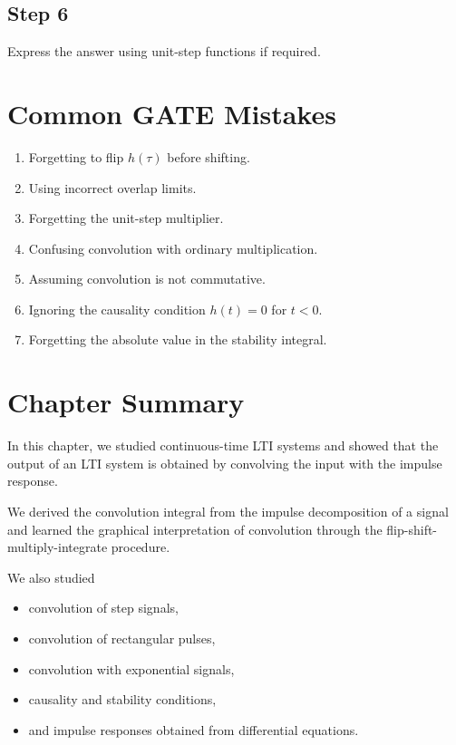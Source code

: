 \subsection{Step 6}

Express the answer using unit-step functions if required.


\section{Common GATE Mistakes}

\begin{enumerate}
\item Forgetting to flip \(h(\tau)\) before shifting.
\item Using incorrect overlap limits.
\item Forgetting the unit-step multiplier.
\item Confusing convolution with ordinary multiplication.
\item Assuming convolution is not commutative.
\item Ignoring the causality condition \(h(t)=0\) for \(t<0\).
\item Forgetting the absolute value in the stability integral.
\end{enumerate}


\section{Chapter Summary}

In this chapter, we studied continuous-time LTI systems and showed that the
output of an LTI system is obtained by convolving the input with the impulse
response.

We derived the convolution integral from the impulse decomposition of a signal
and learned the graphical interpretation of convolution through the
flip-shift-multiply-integrate procedure.

We also studied

\begin{itemize}
\item convolution of step signals,
\item convolution of rectangular pulses,
\item convolution with exponential signals,
\item causality and stability conditions,
\item and impulse responses obtained from differential equations.
\end{itemize}

